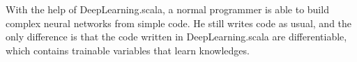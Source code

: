 With the help of DeepLearning.scala, a normal programmer is able to build complex neural networks from simple code. He still writes code as usual, and the only difference is that the code written in DeepLearning.scala are differentiable, which contains \glspl{trainable variable} that learn knowledges.

\clearpage
\appendix

\printglossary

\begin{acks}
\end{acks}


